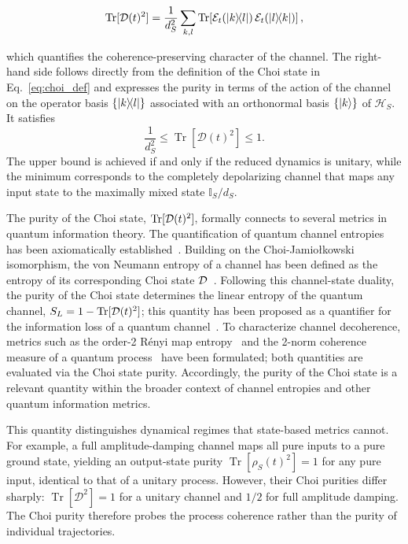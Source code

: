 \documentclass[pra,twocolumn,aps,showpacs,superscriptaddress,longbibliography]{revtex4-2}%
\newcommand{\jami}{Choi-Jamiołkowski}
\begin{document}
\begin{equation}\label{eq:choi:purity}
\operatorname{Tr}[\mathcal{D}(t)^2]
=
\frac{1}{d_S^2}
\sum_{k,l}\operatorname{Tr}\!\left[\mathcal{E}_t(\dyad{k}{l})\,\mathcal{E}_t(\dyad{l}{k})\right],
\end{equation}

which quantifies the coherence-preserving character of the channel. 
The right-hand side follows directly from the definition of the Choi state in Eq.~\eqref{eq:choi_def} and expresses the purity in terms of the action of the channel on the operator basis \(\{\dyad{k}{l}\}\) associated with an orthonormal basis \(\{\ket{k}\}\) of \(\mathcal{H}_S\). It satisfies
\[
\frac{1}{d_S^2}\le\operatorname{Tr}[\mathcal{D}(t)^2]\le 1.
\]
The upper bound is achieved if and only if the reduced dynamics is unitary, while the minimum corresponds to the completely depolarizing channel that maps any input state to the maximally mixed state $\mathbb{I}_S/d_S$.

The purity of the Choi state, $\text{Tr}[\mathcal{D}(t)^2]$, formally connects to several metrics in quantum information theory. The quantification of quantum channel entropies has been axiomatically established~\cite{gour_2021_entropy}. Building on the \jami{} isomorphism, the von Neumann entropy of a channel has been defined as the entropy of its corresponding Choi state $\mathcal{D}$~\cite{chu_2022_entropy}. Following this channel-state duality, the purity of the Choi state determines the linear entropy of the quantum channel, $S_L = 1 - \text{Tr}[\mathcal{D}(t)^2]$; this quantity has been proposed as a quantifier for the information loss of a quantum channel~\cite{li_2025_quantifying}. To characterize channel decoherence, metrics such as the order-2 R\'enyi map entropy~\cite{roga_2011_entropic} and the 2-norm coherence measure of a quantum process~\cite{korzekwa_2018_coherifying} have been formulated; both quantities are evaluated via the Choi state purity. Accordingly, the purity of the Choi state is a relevant quantity within the broader context of channel entropies and other quantum information metrics.

This quantity distinguishes dynamical regimes that state-based metrics cannot. For example, a full amplitude-damping channel maps all pure inputs to a pure ground state, yielding an output-state purity $\operatorname{Tr}[\rho_S(t)^2]=1$ for any pure input, identical to that of a unitary process. However, their Choi purities differ sharply: $\operatorname{Tr}[\mathcal{D}^2]=1$ for a unitary channel and $1/2$ for full amplitude damping. The Choi purity therefore probes the process coherence rather than the purity of individual trajectories.
\end{document}
